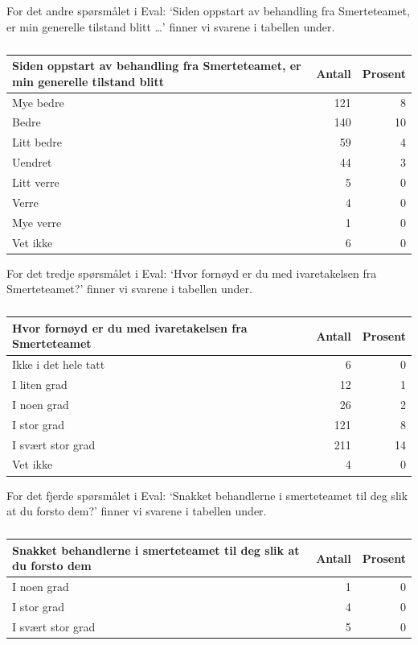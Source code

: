 \documentclass[
]{article}
\begin{document}
For det andre spørsmålet i Eval: `Siden oppstart av behandling fra
Smerteteamet, er min generelle tilstand blitt \ldots{}' finner vi
svarene i tabellen under.

\begin{table}

\caption{\label{tab:evalu}}
\centering
\begin{tabular}[t]{l|r|r}
\hline
Siden oppstart av behandling fra Smerteteamet, er min generelle tilstand blitt & Antall  & Prosent\\
\hline
Mye bedre & 121 & 8\\
\hline
Bedre & 140 & 10\\
\hline
Litt bedre & 59 & 4\\
\hline
Uendret & 44 & 3\\
\hline
Litt verre & 5 & 0\\
\hline
Verre & 4 & 0\\
\hline
Mye verre & 1 & 0\\
\hline
Vet ikke & 6 & 0\\
\hline
\end{tabular}
\end{table}

For det tredje spørsmålet i Eval: `Hvor fornøyd er du med ivaretakelsen
fra Smerteteamet?' finner vi svarene i tabellen under.

\begin{table}

\caption{\label{tab:evalu}}
\centering
\begin{tabular}[t]{l|r|r}
\hline
Hvor fornøyd er du med ivaretakelsen fra Smerteteamet & Antall  & Prosent\\
\hline
Ikke i det hele tatt & 6 & 0\\
\hline
I liten grad & 12 & 1\\
\hline
I noen grad & 26 & 2\\
\hline
I stor grad & 121 & 8\\
\hline
I svært stor grad & 211 & 14\\
\hline
Vet ikke & 4 & 0\\
\hline
\end{tabular}
\end{table}

For det fjerde spørsmålet i Eval: `Snakket behandlerne i smerteteamet
til deg slik at du forsto dem?' finner vi svarene i tabellen under.

\begin{table}

\caption{\label{tab:evalu}}
\centering
\begin{tabular}[t]{l|r|r}
\hline
Snakket behandlerne i smerteteamet til deg slik at du forsto dem & Antall  & Prosent\\
\hline
I noen grad & 1 & 0\\
\hline
I stor grad & 4 & 0\\
\hline
I svært stor grad & 5 & 0\\
\hline
\end{tabular}
\end{table}
\end{document}
